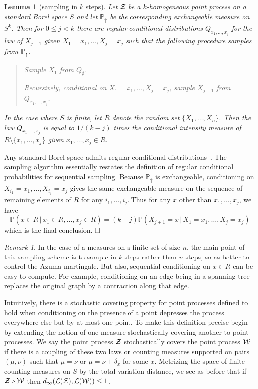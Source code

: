 \documentclass[10pt]{article}
\theoremstyle{plain}
\newtheorem{lem}[thm]{Lemma}
\theoremstyle{remark}
\newtheorem*{unremark}{Remark}
\def\Cox{\qed}
\def\P{{\mathbb P}}
\def\Cox{\hfill \Box}
\def\|{{\, | \, }}
\def\PZ{\P_{\uparrow}}
\def\ZZ{{\cal Z}}
\def\WW{{\cal W}}
\def\cL{{\cal L}}
\def\mcovers{\triangleright}
\begin{document}
\begin{lem}[sampling in $k$ steps] \label{lem:k step}
Let $\ZZ$ be a $k$-homogeneous point process on a standard
Borel space $S$ and let $\PZ$ be the corresponding
exchangeable measure on $S^k$.  Then for $0 \leq j < k$
there are regular conditional distributions $Q_{x_1 , \ldots , x_j}$
for the law of $X_{j+1}$ given $X_1 = x_1 , \ldots , X_j = x_j$
such that the following procedure samples from $\PZ$.
%
\begin{quote}
Sample $X_1$ from $Q_\emptyset$.

Recursively, conditional on $X_1 = x_1 , \ldots , X_j = x_j$,
sample $X_{j+1}$ from $Q_{x_1 , \ldots , x_j}$.
\end{quote}
%
In the case where $S$ is finite, let $R$ denote the random
set $\{ X_1 , \ldots , X_n \}$.  Then the law $Q_{x_1 ,
\ldots , x_j}$ is equal to $1 / (k-j)$ times the conditional
intensity measure of $R \setminus \{ x_1 , \ldots , x_j \}$
given $x_1 , \ldots , x_j \in R$.
\end{lem}

  Any standard Borel space admits
regular conditional distributions~\cite[Theorem~4.1.6]{durrett}.
The sampling algorithm essentially restates the definition
of regular conditional probabilities for sequential sampling.
Because $\PZ$ is exchangeable, conditioning on $X_{i_1} = x_1 ,
\ldots , X_{i_j} = x_j$ gives the same exchangeable measure
on the sequence of remaining elements of $R$ for any
$i_1 , \ldots , i_j$.  Thus for any $x$ other than
$x_1 , \ldots , x_j$, we have
$$\P (x \in R \| x_1 \in R , \ldots , x_j \in R) =
   (k-j) \P (X_{j+1} = x \| X_1 = x_1 , \ldots , X_j = x_j)$$
which is the final conclusion.
$\Cox$

\begin{unremark}
In the case of a measures on a finite set of size $n$, the
main point of this sampling scheme is to sample in $k$ steps
rather than $n$ steps, so as better to control the Azuma martingale.
But also, sequential conditioning on $x \in R$ can be easy to
compute.  For example, conditioning on an edge being in a
spanning tree replaces the original graph by a contraction
along that edge.
\end{unremark}

Intuitively, there is a stochastic covering property for
point processes defined to hold when conditioning on
the presence of a point depresses the process everywhere
else but by at most one point.  To make this definition
precise begin by extending the notion of one measure
stochastically covering another to point processes.
We say the point process $\ZZ$ stochastically covers
the point process $\WW$ if there is a coupling of these
two laws on counting measures supported on pairs $(\mu , \nu)$
such that $\mu = \nu$ or $\mu = \nu + \delta_x$ for some $x$.
Metrizing the space of finite counting measures on $S$ by
the total variation distance, we see as before that if
$\ZZ \mcovers \WW$ then $d_\infty (\cL (\ZZ) , \cL (\WW)) \leq 1$.
\end{document}
